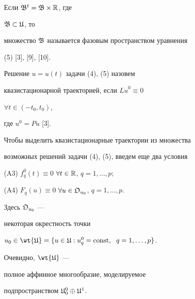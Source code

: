 \begin{note} Если $\frak B^t=\frak B\times\Bbb R$, где


$\frak B\subset\frak U$, то


множество $\frak B$ называется фазовым пространством уравнения


(5) [3], [9], [10].


\end{note}





\begin{defn} Решение $u=u(t)$ задачи (4), (5) назовем


квазистационарной траекторией, если $L\Dot u^0\equiv 0$


$\forall t\in(-t_0,t_0)$,


где $u^0=Pu$ [3].


\end{defn}





Чтобы выделить квазистационарные траектории из множества


возможных решений задачи (4), (5), введем еще два условия





(A3) $f^0_q(t)\equiv 0$ $\forall t\in\Bbb R$, $q=1,\dotsc,p$;





(A4) $F_q(u)\equiv 0$ $\forall u\in\frak O_{u_0}$, $q=1,\dotsc,p$.





\noindent{}Здесь $\frak O_{u_0}$ ---


некоторая окрестность точки


$u_0\in\wt{\frak U}=\{u\in\frak U:u^0_q=\text{const},\ \;


q=1,\dotsc,p\}$.


Очевидно, $\wt{\frak U}$ ---


полное аффинное многообразие, моделируемое


подпространством $\frak U^0_0\oplus\frak U^1$.





